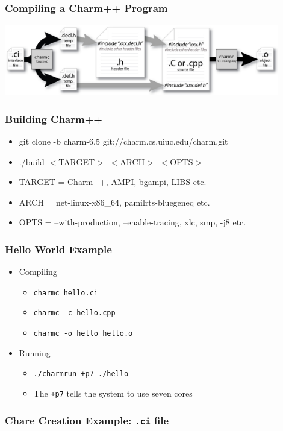 \begin{frame}
   \frametitle{Compiling a Charm++ Program}
   \begin{center}
     \includegraphics[width=0.9\textwidth]{figures/charmCompile.jpg}
   \end{center}
\end{frame}

\begin{frame}
  \frametitle{Building Charm++}
  \begin{itemize}
  \item git clone -b charm-6.5 git://charm.cs.uiuc.edu/charm.git
  \item ./build $<$TARGET$>$ $<$ARCH$>$ $<$OPTS$>$
  \item TARGET = Charm++, AMPI, bgampi, LIBS etc.
  \item ARCH = net-linux-x86\_64, pamilrts-bluegeneq etc.
  \item OPTS = --with-production, --enable-tracing, xlc, smp, -j8 etc.
  \end{itemize}
\end{frame}

\begin{frame}
  \frametitle{Hello World Example}
  \begin{itemize}
    \item Compiling
      \begin{itemize}
      \item \texttt{charmc hello.ci}
      \item \texttt{charmc -c hello.cpp}
      \item \texttt{charmc -o hello hello.o}
      \end{itemize}
    \item Running
      \begin{itemize}
      \item \texttt{./charmrun +p7 ./hello}
      \item The \texttt{+p7} tells the system to use seven cores
      \end{itemize}
    \end{itemize}
\end{frame}


\begin{frame}[fragile]
  \frametitle{Chare Creation Example: \texttt{.ci} file}
  
\end{frame}

